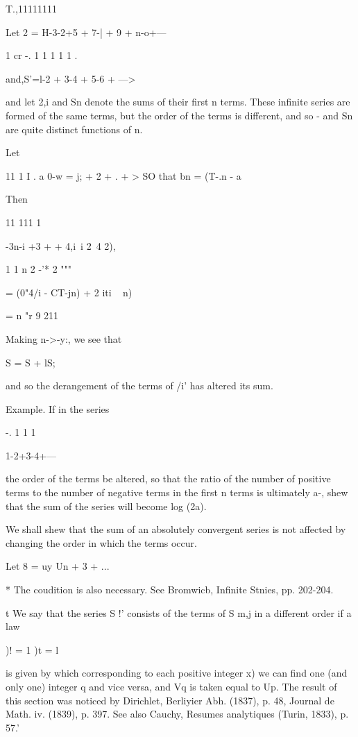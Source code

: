 T.,11111111

Let 2 = H-3-2+5 + 7-| + 9 + n-o+---

1 cr -. 1 1 1 1 1 .

and,S'=l-2 + 3-4 + 5-6 + --->

and let 2,i and Sn denote the sums of their first n terms. These
infinite series are formed of the same terms, but the order of the
terms is different, and so - and Sn are quite distinct functions of n.

Let

11 1 I . a 0-w = j; + 2 +   . + > SO that bn = (T-.n - a

Then

 11 111 1

-3n-i +3 +  + 4,i\ i 2~4  2),

1 1 n 2 -'* 2 """

= (0"4/i - CT-jn) + 2 iti ~ n)

= n "r 9 211

Making n->-y:, we see that

S = S + lS;

and so the derangement of the terms of /i' has altered its sum.

Example. If in the series

-. 1 1 1

1-2+3-4+---

the order of the terms be altered, so that the ratio of the number of
positive terms to the number of negative terms in the first n terms is
ultimately a-, shew that the sum of the series will become log (2a).

We
shall shew that the sum of an absolutely convergent series is not
affected by changing the order in which the terms occur.

Let 8 = uy Un + 3 + ...

* The coudition is also necessary. See Bromwicb, Infinite Stnies, pp.
202-204.

t We say that the series S !' consists of the terms of S m,j in a
different order if a law

)! = 1 )t = l

is given by which corresponding to each positive integer x) we can
find one (and only one) integer q and vice versa, and Vq is taken
equal to Up. The result of this section was noticed by Dirichlet,
Berliyier Abh. (1837), p. 48, Journal de Math. iv. (1839), p. 397. See
also Cauchy, Resumes analytiques (Turin, 1833), p. 57.'

